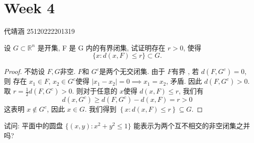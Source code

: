 \documentclass[../main.tex]{subfiles}
\begin{document}
\ifSubfilesClassLoaded{

    
    \setcounter{chapter}{3}
}{}

\chapter{ Week 4 }

代靖涵 25120222201319


\begin{exercise}{}{}
设 $G \subset \mathbb{R}^n$ 是开集, F 是 G 内的有界闭集, 试证明存在 $r > 0$, 使得
\[ \{x: d(x, F) \le r\} \subset G. \]
\end{exercise}

\begin{proof}
     不妨设 \(  F,G  \)非空. \(  F  \)和 \(  G^{c}  \)是两个无交闭集. 由于 \(  F  \)有界 , 若 \(  d\left( F,G^{c} \right)= 0   \), 则 存在 \(  x_1\in F  \), \(  x_2\in G^{c} \)使得 \(  \left| x_1-x_2 \right|= 0 \implies x_1= x_2  \), 矛盾. 因此 \(  d\left( F,G^{c} \right)> 0   \). 取 \(  r=\frac{1 }{2 }  d\left( F,G^{c} \right) > 0  \).  则对于任意的 \(  x  \)使得 \(  d\left( x,F \right)\le r   \),  我们有 \[
     d\left( x,G^{c} \right)\ge d\left( F,G^{c} \right)-d\left( x,F \right)=   r> 0
     \]这表明 \(  x\not \in G^{c}  \), 因此 \(  x \in G  \). 我们得到 \(  \left\{ x:d\left( x,F \right)\le r  \right\}  \subseteq G\).           
\end{proof}

\begin{exercise}{}{}
    试问: 平面中的圆盘 $\{(x, y) : x^2 + y^2 \le 1\}$ 能表示为两个互不相交的非空闭集之并吗?
\end{exercise}
\end{document}
